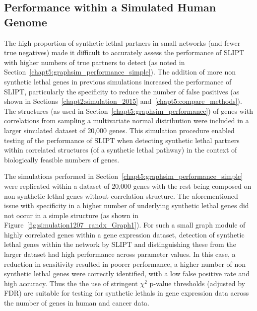 \FloatBarrier

\subsection{Performance within a Simulated Human Genome}
\label{chapt5:graphsim_performance_20K}

\FloatBarrier


The high proportion of \gls{synthetic lethal} partners in small networks (and fewer true negatives) made it difficult to accurately assess the performance of \gls{SLIPT} with higher numbers of true partners to detect (as noted in Section~\ref{chapt5:graphsim_performance_simple}). The addition of more non synthetic lethal genes in previous simulations increased the performance of \gls{SLIPT}, particularly the specificity to reduce the number of false positives (as shown in Sections~\ref{chapt2:simulation_2015} and~\ref{chapt5:compare_methods}). The  structures (as used in Section~\ref{chapt5:graphsim_performance}) of genes with correlations from sampling a multivariate normal distribution were included in a larger simulated dataset of 20,000 genes. This simulation procedure enabled testing of the performance of \gls{SLIPT} when detecting \gls{synthetic lethal} partners within correlated  structures (of a \gls{synthetic lethal} pathway) in the context of biologically feasible numbers of genes. 



The simulations performed in Section~\ref{chapt5:graphsim_performance_simple} were replicated within a dataset of 20,000 genes with the rest being composed on non synthetic lethal genes without correlation structure. The aforementioned issue with specificity in a higher number of underlying \gls{synthetic lethal} genes did not occur in a simple  structure (as shown in Figure~\ref{fig:simulation1207_randx_Graph1}). For such a small graph module of highly correlated genes within a \gls{gene expression} dataset, detection of \gls{synthetic lethal} genes within the network by \gls{SLIPT} and distinguishing these from the larger dataset had high performance across parameter values. In this case, a reduction in sensitivity resulted in poorer performance, a higher number of non synthetic lethal genes were correctly identified, with a low false positive rate and high accuracy. Thus the the use of stringent $\chi^2$ p-value thresholds (adjusted by \gls{FDR}) are suitable for testing for \glspl{synthetic lethal} in \gls{gene expression} data across the number of genes in human and cancer data.

